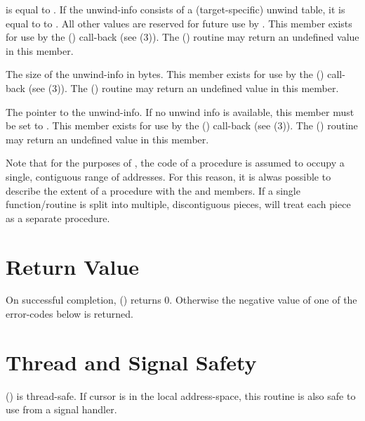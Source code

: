 \documentclass{article}
\begin{document}
\begin{description}
   is equal to .  If the
  unwind-info consists of a (target-specific) unwind table, it is
  equal to to .  All other values are
  reserved for future use by .  This member exists
  for use by the () call-back (see
  (3)).  The
  () routine
  may return an undefined value in this member. \\
\item[\Type{int} \Var{unwind\_info\_size}] The size of the unwind-info
  in bytes.  This member exists for use by the
  () call-back (see
  (3)).  The
  () routine
  may return an undefined value in this member.\\
\item[\Type{void~*}\Var{unwind\_info}] The pointer to the unwind-info.
  If no unwind info is available, this member must be set to
  .  This member exists for use by the
  () call-back (see
  (3)).  The
  () routine
  may return an undefined value in this member.\\
\end{description}
Note that for the purposes of , the code of a
procedure is assumed to occupy a single, contiguous range of
addresses.  For this reason, it is alwas possible to describe the
extent of a procedure with the  and 
members.  If a single function/routine is split into multiple,
discontiguous pieces,  will treat each piece as a
separate procedure.

\section{Return Value}

On successful completion, () returns 0.
Otherwise the negative value of one of the error-codes below is
returned.

\section{Thread and Signal Safety}

() is thread-safe.  If cursor  is
in the local address-space, this routine is also safe to use from a
signal handler.
\end{document}
